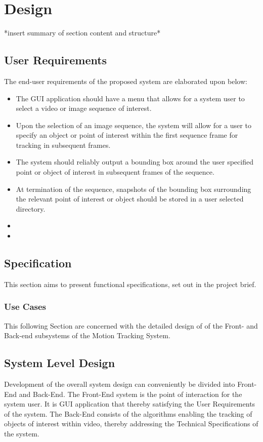 \chapter{Design}\label{chapter_design}
*insert summary of section content and structure*

\section{User Requirements}
The end-user requirements of the proposed system are elaborated upon below:
\begin{itemize}
    \item The GUI application should have a menu that allows for a system
        user to select a video or image sequence of interest.
    \item Upon the selection of an image sequence, the system will allow for a
        user to specify an object or point of interest within the first sequence
        frame for tracking in subsequent frames.
    \item The system should reliably output a bounding box around the user
        specified point or object of interest in subsequent frames of the
        sequence. 
    \item At termination of the sequence, snapshots of the bounding box
        surrounding the relevant point of interest or object should be stored in
        a user selected directory.
    \item
    \item
\end{itemize}

\section{Specification}
This section aims to present functional specifications, set out in the
project brief.

\subsection{Use Cases}
This following Section are concerned with the detailed design of of the Front- and Back-end
subsystems of the Motion Tracking System.

\section{System Level Design}
Development of the overall system design can conveniently be divided into
Front-End and Back-End. The Front-End system is the point of interaction for the
system user. It is GUI application that thereby satisfying the User Requirements
of the system. The Back-End consists of the algorithms enabling the tracking of
objects of interest within video, thereby addressing the Technical
Specifications of the system.


